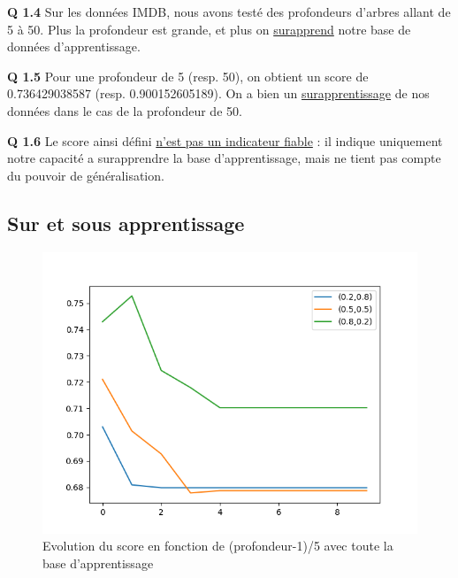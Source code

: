 \documentclass{article}
\begin{document}
\textbf{Q 1.4} Sur les données IMDB, nous avons testé des
profondeurs d'arbres allant de 5 à 50. Plus la profondeur
est grande, et plus on \underline{surapprend} notre base de
données d'apprentissage.

\textbf{Q 1.5} Pour une profondeur de 5 (resp. 50), on
obtient un score de 0.736429038587 (resp. 0.900152605189).
On a bien un \underline{surapprentissage} de nos données
dans le cas de la profondeur de 50.

\textbf{Q 1.6} Le score ainsi défini \underline{n'est pas un
indicateur fiable} : il indique uniquement notre capacité a
surapprendre la base d'apprentissage, mais ne tient pas
compte du pouvoir de généralisation.

\subsection*{Sur et sous apprentissage}

\begin{center}
  \begin{figure}
    \includegraphics[width=\textwidth,
    keepaspectratio]{Figure_1}
    \caption{Evolution du score en fonction de
    (profondeur-1)/5 avec toute la base d'apprentissage}
  \end{figure}
\end{center}
\end{document}
